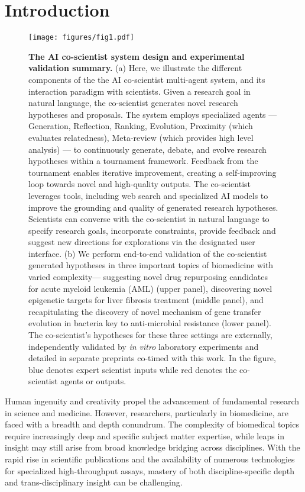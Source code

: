 \section{Introduction}
\label{sec:introduction}

\begin{figure}[htbp!]
\centering
\texttt{[image: figures/fig1.pdf]}
\vspace{0.1cm}
\caption{\textbf{The AI co-scientist system design and experimental validation summary.} (a) Here, we illustrate the different components of the the AI co-scientist multi-agent system, and its interaction paradigm with scientists. Given a research goal in natural language, the co-scientist generates novel research hypotheses and proposals. The system employs specialized agents — Generation, Reflection, Ranking, Evolution, Proximity (which evaluates relatedness), Meta-review (which provides high level analysis) — to continuously generate, debate, and evolve research hypotheses within a tournament framework. Feedback from the tournament enables iterative improvement, creating a self-improving loop towards novel and high-quality outputs. The co-scientist leverages tools, including web search and specialized AI models to improve the grounding and quality of generated research hypotheses. Scientists can converse with the co-scientist in natural language to specify research goals, incorporate constraints, provide feedback and suggest new directions for explorations via the designated user interface. (b) We perform end-to-end validation of the co-scientist generated hypotheses in three important topics of biomedicine with varied complexity--- suggesting novel drug repurposing candidates for acute myeloid leukemia (AML) (upper panel), discovering novel epigenetic targets for liver fibrosis treatment (middle panel), and recapitulating the discovery of novel mechanism of gene transfer evolution in bacteria key to anti-microbial resistance (lower panel). The co-scientist's hypotheses for these three settings are externally, independently validated by \textit{in vitro} laboratory experiments and detailed in separate preprints co-timed with this work. In the figure, blue denotes expert scientist inputs while red denotes the co-scientist agents or outputs.
}
\label{fig:system-overview}
\end{figure}

Human ingenuity and creativity propel the advancement of fundamental research in science and medicine. However, researchers, particularly in biomedicine, are faced with a breadth and depth conundrum. The complexity of biomedical topics require increasingly deep and specific subject matter expertise, while leaps in insight may still arise from broad knowledge bridging across disciplines. With the rapid rise in scientific publications and the availability of numerous technologies for specialized high-throughput assays, mastery of both discipline-specific depth and trans-disciplinary insight can be challenging.

